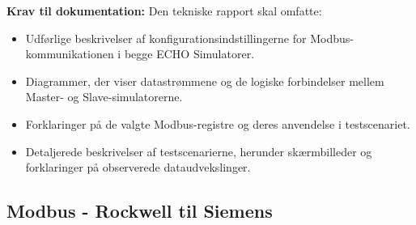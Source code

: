\textbf{Krav til dokumentation:}
Den tekniske rapport skal omfatte:
\begin{itemize}
	\item Udførlige beskrivelser af konfigurationsindstillingerne for Modbus-kommunikationen i begge ECHO Simulatorer.
	\item Diagrammer, der viser datastrømmene og de logiske forbindelser mellem Master- og Slave-simulatorerne.
	\item Forklaringer på de valgte Modbus-registre og deres anvendelse i testscenariet.
	\item Detaljerede beskrivelser af testscenarierne, herunder skærmbilleder og forklaringer på observerede dataudvekslinger.
\end{itemize}


\subsection*{Modbus - Rockwell til Siemens}
\label{subsec:modbus_communication_plcsim_advanced}


